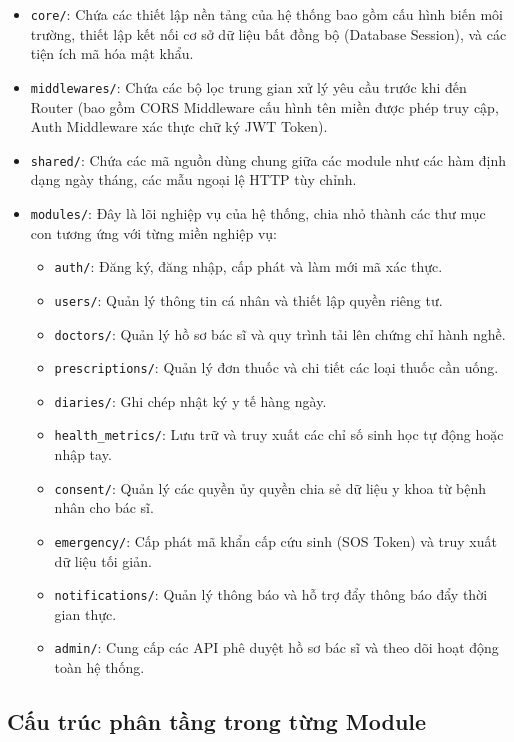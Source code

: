 \documentclass[12pt,a4paper]{report}
\begin{document}
\begin{itemize}[leftmargin=1.5em, itemsep=4pt]
    \item \texttt{core/}: Chứa các thiết lập nền tảng của hệ thống bao gồm cấu hình biến môi trường, thiết lập kết nối cơ sở dữ liệu bất đồng bộ (Database Session), và các tiện ích mã hóa mật khẩu.
    \item \texttt{middlewares/}: Chứa các bộ lọc trung gian xử lý yêu cầu trước khi đến Router (bao gồm CORS Middleware cấu hình tên miền được phép truy cập, Auth Middleware xác thực chữ ký JWT Token).
    \item \texttt{shared/}: Chứa các mã nguồn dùng chung giữa các module như các hàm định dạng ngày tháng, các mẫu ngoại lệ HTTP tùy chỉnh.
    \item \texttt{modules/}: Đây là lõi nghiệp vụ của hệ thống, chia nhỏ thành các thư mục con tương ứng với từng miền nghiệp vụ:
    \begin{itemize}[leftmargin=1em, itemsep=2pt]
        \item \texttt{auth/}: Đăng ký, đăng nhập, cấp phát và làm mới mã xác thực.
        \item \texttt{users/}: Quản lý thông tin cá nhân và thiết lập quyền riêng tư.
        \item \texttt{doctors/}: Quản lý hồ sơ bác sĩ và quy trình tải lên chứng chỉ hành nghề.
        \item \texttt{prescriptions/}: Quản lý đơn thuốc và chi tiết các loại thuốc cần uống.
        \item \texttt{diaries/}: Ghi chép nhật ký y tế hàng ngày.
        \item \texttt{health\_metrics/}: Lưu trữ và truy xuất các chỉ số sinh học tự động hoặc nhập tay.
        \item \texttt{consent/}: Quản lý các quyền ủy quyền chia sẻ dữ liệu y khoa từ bệnh nhân cho bác sĩ.
        \item \texttt{emergency/}: Cấp phát mã khẩn cấp cứu sinh (SOS Token) và truy xuất dữ liệu tối giản.
        \item \texttt{notifications/}: Quản lý thông báo và hỗ trợ đẩy thông báo đẩy thời gian thực.
        \item \texttt{admin/}: Cung cấp các API phê duyệt hồ sơ bác sĩ và theo dõi hoạt động toàn hệ thống.
    \end{itemize}
\end{itemize}

\subsection{Cấu trúc phân tầng trong từng Module}
\end{document}
